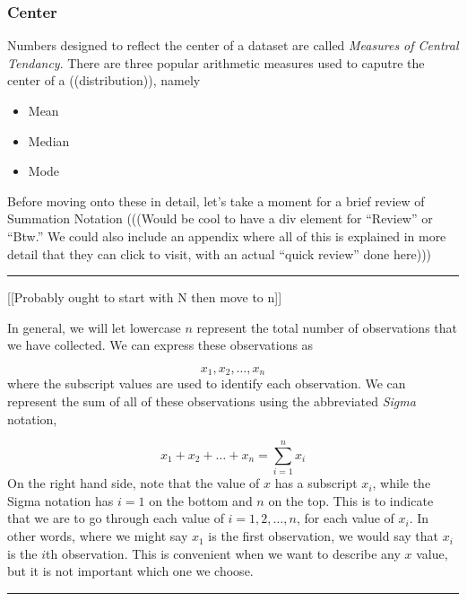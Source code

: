\documentclass[
]{book}
\providecommand{\tightlist}{%
  \setlength{\itemsep}{0pt}\setlength{\parskip}{0pt}}
\theoremstyle{definition}
\theoremstyle{definition}
\theoremstyle{definition}
\theoremstyle{remark}
\begin{document}
\hypertarget{center}{%
\subsubsection{Center}\label{center}}

Numbers designed to reflect the center of a dataset are called \emph{Measures of Central Tendancy}. There are three popular arithmetic measures used to caputre the center of a ((distribution)), namely

\begin{itemize}
\tightlist
\item
  Mean
\item
  Median
\item
  Mode
\end{itemize}

Before moving onto these in detail, let's take a moment for a brief review of Summation Notation (((Would be cool to have a div element for ``Review'' or ``Btw.'' We could also include an appendix where all of this is explained in more detail that they can click to visit, with an actual ``quick review'' done here)))

\begin{center}\rule{0.5\linewidth}{0.5pt}\end{center}

{[}{[}Probably ought to start with N then move to n{]}{]}

In general, we will let lowercase \(n\) represent the total number of observations that we have collected. We can express these observations as

\[
x_1, x_2, \dots, x_n
\]
where the subscript values are used to identify each observation. We can represent the sum of all of these observations using the abbreviated \emph{Sigma} notation,

\[
x_1 + x_2 + \dots + x_n = \sum_{i=1}^n x_i
\]
On the right hand side, note that the value of \(x\) has a subscript \(x_i\), while the Sigma notation has \(i=1\) on the bottom and \(n\) on the top. This is to indicate that we are to go through each value of \(i = 1, 2, \dots, n\), for each value of \(x_i\). In other words, where we might say \(x_1\) is the first observation, we would say that \(x_i\) is the \(i\)th observation. This is convenient when we want to describe any \(x\) value, but it is not important which one we choose.

\begin{center}\rule{0.5\linewidth}{0.5pt}\end{center}
\end{document}
